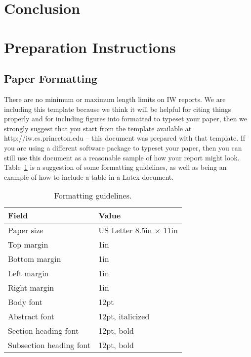 \documentclass[pageno]{jpaper}
\begin{document}
\section{Conclusion}



\section{Preparation Instructions}

\subsection{Paper Formatting}

There are no minimum or maximum length limits on IW reports.  
We are including this template because we think it will be helpful
for citing things properly and for including figures into formatted
to typeset your paper, then we strongly suggest
that you start from the template available at
http://iw.cs.princeton.edu -- this
document was prepared with that template.  
If you are using a different software package to typeset your paper, 
then you can still use this document as a reasonable sample of 
how your report might look.  Table~\ref{table:formatting} is a suggestion
of some formatting guidelines, as well as being an example of how to
include a table in a Latex document.

\begin{table}[h!]
  \centering
  \begin{tabular}{|l|l|}
    \hline
    \textbf{Field} & \textbf{Value}\\
    \hline
    \hline
    Paper size & US Letter 8.5in $\times$ 11in\\
    \hline
    Top margin & 1in\\
    \hline
    Bottom margin & 1in\\
    \hline
    Left margin & 1in\\
    \hline
    Right margin & 1in\\
    \hline
    Body font & 12pt\\
    \hline
    Abstract font & 12pt, italicized\\
    \hline
    Section heading font & 12pt, bold\\
    \hline
    Subsection heading font & 12pt, bold\\
    \hline
  \end{tabular}
  \caption{Formatting guidelines. }
  \label{table:formatting}
\end{table}
\end{document}

